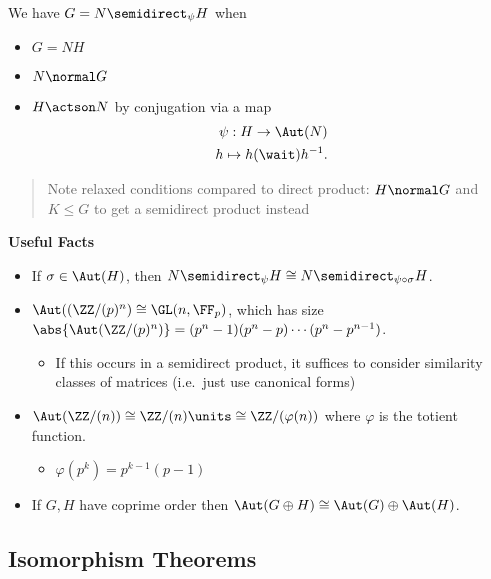 \begin{theorem}

We have \(G = N \semidirect_\psi H\) when

\begin{itemize}
\item
  \(G = NH\)
\item
  \(N \normal G\)
\item
  \(H \actson N\) by conjugation via a map \begin{align*}
  \psi: H \to \Aut(N) \\
  h \mapsto h(\wait)h^{-1}
  .\end{align*}
\end{itemize}

\begin{quote}
Note relaxed conditions compared to direct product: \(H\normal G\) and
\(K\leq G\) to get a semidirect product instead
\end{quote}

\end{theorem}

\textbf{Useful Facts}

\begin{itemize}
\item
  If \(\sigma \in \Aut(H)\), then
  \(N \semidirect_\psi H \cong N \semidirect_{\psi \circ \sigma} H\).
\item
  \(\Aut((\ZZ/(p)^n) \cong \GL(n, \FF_p)\), which has size
  \(\abs{\Aut(\ZZ/(p)^n)} = (p^n-1)(p^n-p)\cdots(p^n-p^{n-1})\).

  \begin{itemize}
  \tightlist
  \item
    If this occurs in a semidirect product, it suffices to consider
    similarity classes of matrices (i.e.~just use canonical forms)
  \end{itemize}
\item
  \(\Aut(\ZZ/(n)) \cong \ZZ/(n)\units \cong \ZZ/({\varphi(n)})\) where
  \(\varphi\) is the totient function.

  \begin{itemize}
  \tightlist
  \item
    \(\varphi(p^k) = p^{k-1}(p-1)\)
  \end{itemize}
\item
  If \(G, H\) have coprime order then
  \(\Aut(G\oplus H) \cong \Aut(G) \oplus \Aut(H)\).
\end{itemize}

\hypertarget{isomorphism-theorems}{%
\subsection{Isomorphism Theorems}\label{isomorphism-theorems}}

